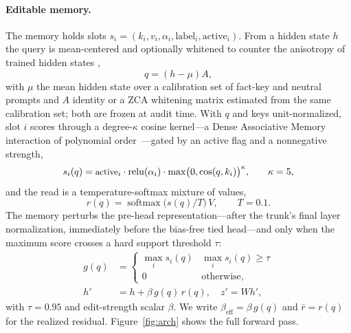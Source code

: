 \documentclass[10pt,twocolumn]{article}
\theoremstyle{remark}
\DeclareMathOperator{\relu}{relu}
\DeclareMathOperator{\softmax}{softmax}
\begin{document}
\paragraph{Editable memory.} The memory holds slots
$s_i=(k_i,v_i,\alpha_i,\text{label}_i,\text{active}_i)$. From a hidden state $h$
the query is mean-centered and optionally whitened to counter the anisotropy of
trained hidden states \citep{ethayarajh2019contextual, gao2019degeneration},
\begin{equation}
q=(h-\mu)A,
\end{equation}
with $\mu$ the mean hidden state over a calibration set of fact-key and neutral
prompts and $A$ identity or a ZCA whitening matrix estimated from the same
calibration set; both are frozen at audit time. With $q$ and
keys unit-normalized, slot $i$ scores through a degree-$\kappa$ cosine kernel---a
Dense Associative Memory interaction of polynomial order~\citep{krotov2016dense}---gated
by an active flag and a nonnegative strength,
\begin{equation}
\small
s_i(q)=\text{active}_i\cdot\relu(\alpha_i)\cdot\max\!\big(0,\cos(q,k_i)\big)^{\kappa},\qquad \kappa=5,
\label{eq:score}
\end{equation}
and the read is a temperature-softmax mixture of values,
\begin{equation}
r(q)=\softmax\!\big(s(q)/T\big)\,V,\qquad T=0.1.
\end{equation}
The memory perturbs the pre-head representation---after the trunk's final layer
normalization, immediately before the bias-free tied head---and only when the
maximum score crosses a hard support threshold $\tau$:
\begin{equation}
\begin{aligned}
g(q)&=\begin{cases}\max_i s_i(q) & \max_i s_i(q)\ge\tau\\ 0 & \text{otherwise,}\end{cases}\\
h'&=h+\beta\,g(q)\,r(q),\quad z'=Wh',
\end{aligned}
\label{eq:hook}
\end{equation}
with $\tau=0.95$ and edit-strength scalar $\beta$. We write
$\beta_{\mathrm{eff}}=\beta\,g(q)$ and $\bar r=r(q)$ for the realized residual.
Figure~\ref{fig:arch} shows the full forward pass.
\end{document}
